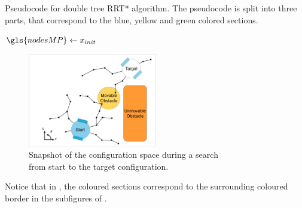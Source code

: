 \begin{algorithm}[H]
\caption{Pseudocode for double tree \ac{RRT*} algorithm. The pseudocode is split into three parts,  that correspond to the blue, yellow and green colored sections.}%
\label{pseudocode:proposed_rrt_star_all}
\begin{algorithmic}[1]

\hspace{-0.9cm}\colorbox{my_grey}{\parbox{\linewidth}{%
\State $\gls{nodesMP} \leftarrow x_{init}$

\hspace{-0.1cm}\colorbox{my_light_blue}{\parbox{\linewidth}{%
}}

\hspace{-0.1cm}\colorbox{my_yellow}{\parbox{\linewidth}{%
}}

\hspace{-0.1cm}\colorbox{my_green}{\parbox{\linewidth}{%
}}
\EndWhile
}}
\end{algorithmic}
\end{algorithm}

\begin{figure}[H]
    \centering
    \includegraphics[width=0.5\textwidth, cfbox=my_grey 5pt 0pt]{figures/required_background/mp/1mp_init.drawio.png}
    \caption{Snapshot of the configuration space during a search\\from start to the target configuration.}
    \label{fig:motion_planner_adding_one_sample_one}
\end{figure}

Notice that in , the coloured sections correspond to the surrounding coloured border in the subfigures of .\bs





